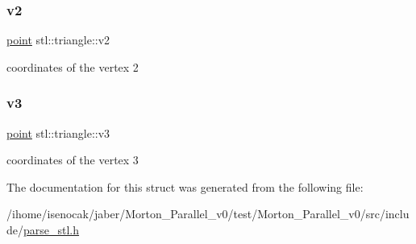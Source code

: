 \subsubsection{\texorpdfstring{v2}{v2}}
{\footnotesize\ttfamily \mbox{\hyperlink{structstl_1_1point}{point}} stl\+::triangle\+::v2}

coordinates of the vertex 2 \mbox{\label{structstl_1_1triangle_a641b217506153b32a9318535a60b6131}} 
\subsubsection{\texorpdfstring{v3}{v3}}
{\footnotesize\ttfamily \mbox{\hyperlink{structstl_1_1point}{point}} stl\+::triangle\+::v3}

coordinates of the vertex 3 

The documentation for this struct was generated from the following file\+:\begin{DoxyCompactItemize}
\item 
/ihome/isenocak/jaber/\+Morton\+\_\+\+Parallel\+\_\+v0/test/\+Morton\+\_\+\+Parallel\+\_\+v0/src/include/\mbox{\hyperlink{parse__stl_8h}{parse\+\_\+stl.\+h}}\end{DoxyCompactItemize}
